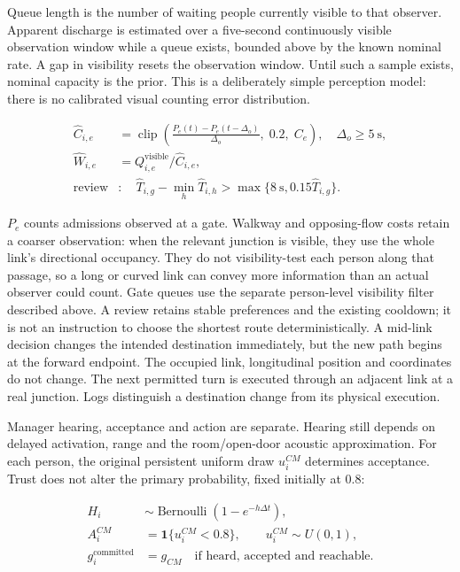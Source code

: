 \documentclass[11pt,a4paper]{article}
\begin{document}
Queue length is the number of waiting people currently visible to that observer. Apparent discharge is estimated over a five-second continuously visible observation window while a queue exists, bounded above by the known nominal rate. A gap in visibility resets the observation window. Until such a sample exists, nominal capacity is the prior. This is a deliberately simple perception model: there is no calibrated visual counting error distribution.


\begin{equation}
\begin{aligned}
 \widehat C_{i,e}&=\operatorname{clip}\!\left(
 \frac{P_e(t)-P_e(t-\Delta_o)}{\Delta_o},\;0.2,\;C_e\right),\quad \Delta_o\ge5\ \mathrm{s},\\
 \widehat W_{i,e}&=Q^{\mathrm{visible}}_{i,e}/\widehat C_{i,e},\\
 \text{review}&:\quad \widehat T_{i,g}-\min_h\widehat T_{i,h}
 >\max\{8\ \mathrm{s},0.15\widehat T_{i,g}\}.
\end{aligned}\tag{29}\label{eq:29}
\end{equation}

$P_e$ counts admissions observed at a gate. Walkway and opposing-flow costs retain a coarser observation: when the relevant junction is visible, they use the whole link’s directional occupancy. They do not visibility-test each person along that passage, so a long or curved link can convey more information than an actual observer could count. Gate queues use the separate person-level visibility filter described above. A review retains stable preferences and the existing cooldown; it is not an instruction to choose the shortest route deterministically. A mid-link decision changes the intended destination immediately, but the new path begins at the forward endpoint. The occupied link, longitudinal position and coordinates do not change. The next permitted turn is executed through an adjacent link at a real junction. Logs distinguish a destination change from its physical execution.


Manager hearing, acceptance and action are separate. Hearing still depends on delayed activation, range and the room/open-door acoustic approximation. For each person, the original persistent uniform draw $u_i^{CM}$ determines acceptance. Trust does not alter the primary probability, fixed initially at 0.8:


\begin{equation}
\begin{aligned}
 H_i&\sim\operatorname{Bernoulli}(1-e^{-h\Delta t}),\\
 A_i^{CM}&=\mathbf1\{u_i^{CM}<0.8\},\qquad u_i^{CM}\sim U(0,1),\\
 g_i^{\mathrm{committed}}&=g_{CM}\quad\text{if heard, accepted and reachable}.
\end{aligned}\tag{30}\label{eq:30}
\end{equation}
\end{document}
